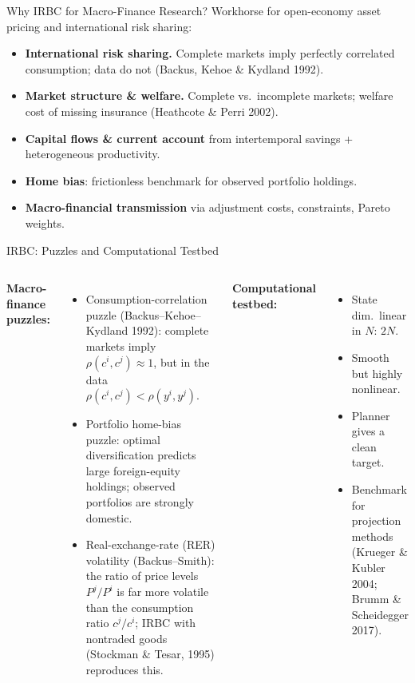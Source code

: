 \documentclass[aspectratio=169,11pt]{beamer}
\newcommand{\emphc}[1]{\textcolor{harvardcrimson}{#1}}
\begin{document}
\begin{frame}{Why IRBC for Macro-Finance Research?}
\footnotesize
Workhorse for \emphc{open-economy asset pricing} and \emphc{international risk sharing}:

\vspace{0.2em}
\begin{itemize}\itemsep0pt
    \item \textbf{International risk sharing.}  Complete markets imply perfectly correlated consumption; data do not (Backus, Kehoe \& Kydland 1992).
    \item \textbf{Market structure \& welfare.}  Complete vs.\ incomplete markets; welfare cost of missing insurance (Heathcote \& Perri 2002).
    \item \textbf{Capital flows \& current account} from intertemporal savings + heterogeneous productivity.
    \item \textbf{Home bias}: frictionless benchmark for observed portfolio holdings.
    \item \textbf{Macro-financial transmission} via adjustment costs, constraints, Pareto weights.
\end{itemize}
\end{frame}

\begin{frame}{IRBC: Puzzles and Computational Testbed}
\footnotesize
\begin{columns}[T]
\textbf{Macro-finance puzzles:}
\begin{itemize}\itemsep2pt
    \item \emphc{Consumption-correlation puzzle} (Backus--Kehoe--Kydland 1992):
    complete markets imply $\rho(c^i,c^j)\!\approx\!1$, but in the data $\rho(c^i,c^j)<\rho(y^i,y^j)$.
    \item \emphc{Portfolio home-bias puzzle}: optimal diversification predicts large foreign-equity holdings; observed portfolios are strongly domestic.
    \item \emphc{Real-exchange-rate (RER) volatility} (Backus--Smith): the ratio of price levels $P^j/P^i$ is far more volatile than the consumption ratio $c^j/c^i$; IRBC with nontraded goods (Stockman \& Tesar, 1995) reproduces this.
\end{itemize}

\textbf{Computational testbed:}
\begin{itemize}\itemsep0pt
    \item State dim.\ \emphc{linear} in $N$: $2N$.
    \item Smooth but \emphc{highly nonlinear}.
    \item \emphc{Planner} gives a clean target.
    \item Benchmark for projection methods (Krueger \& Kubler 2004; Brumm \& Scheidegger 2017).
\end{itemize}
\end{columns}
\end{frame}
\end{document}
